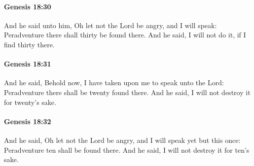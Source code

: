 		\paragraph{Genesis 18:30} %
			\label{GENESIS-18-30}

			And he said unto him, Oh let not the Lord be angry, and I will speak: Peradventure there shall thirty be found there.  And he said, I will not do it, if I find thirty there.


		\paragraph{Genesis 18:31} %
			\label{GENESIS-18-31}

			And he said, Behold now, I have taken upon me to speak unto the Lord: Peradventure there shall be twenty found there.  And he said, I will not destroy it for twenty's sake.


		\paragraph{Genesis 18:32} %
			\label{GENESIS-18-32}

			And he said, Oh let not the Lord be angry, and I will speak yet but this once: Peradventure ten shall be found there.  And he said, I will not destroy it for ten's sake.


